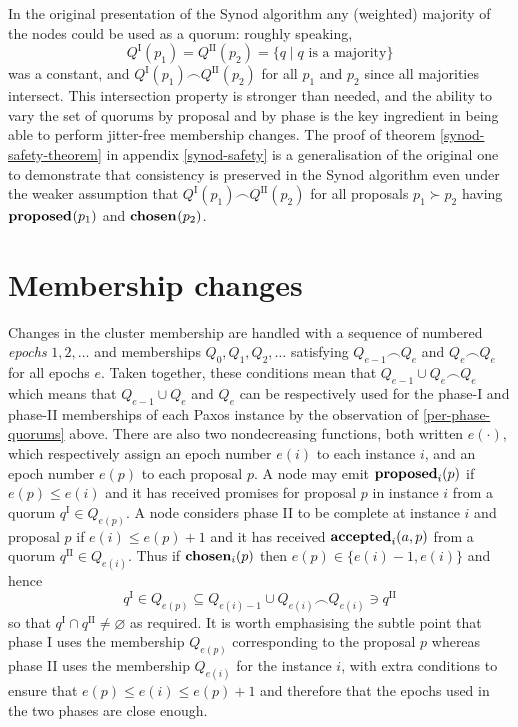 \documentclass[journal]{IEEEtran}
\begin{document}
In the original presentation of the Synod algorithm any (weighted) majority of
the nodes could be used as a quorum: roughly speaking, \[Q^\textrm{I}(p_1) =
Q^\textrm{II}(p_2) = \{ q \mid q \text{ is a majority}\}\] was a constant, and
$Q^\textrm{I}(p_1) \frown Q^\textrm{II}(p_2)$ for all $p_1$ and $p_2$ since all
majorities intersect. This intersection property is stronger than needed, and
the ability to vary the set of quorums by proposal and by phase is the key
ingredient in being able to perform jitter-free membership changes. The proof
of theorem \ref{synod-safety-theorem} in appendix \ref{synod-safety} is a
generalisation of the original one to demonstrate that consistency is preserved
in the Synod algorithm even under the weaker assumption that $Q^\textrm{I}(p_1)
\frown Q^\textrm{II}(p_2)$ for all proposals $p_1 \succ p_2$ having
$\mathbf{proposed}_{}(p_1)$ and $\mathbf{chosen}_{}(p_2)$.

\section{Membership changes}\label{membership-changes}

Changes in the cluster membership are handled with a sequence of numbered
\textit{epochs} $1, 2, \ldots$ and memberships $Q_0, Q_1, Q_2, \ldots$
satisfying $Q_{e-1} \frown Q_e$ and $Q_e \frown Q_e$ for all epochs $e$.  Taken
together, these conditions mean that $Q_{e-1} \cup Q_e \frown Q_e$ which means
that $Q_{e-1} \cup Q_e$ and $Q_e$ can be respectively used for the phase-I and
phase-II memberships of each Paxos instance by the observation of
\ref{per-phase-quorums} above.  There are also two nondecreasing functions,
both written $e(\cdot)$, which respectively assign an epoch number $e(i)$ to
each instance $i$, and an epoch number $e(p)$ to each proposal $p$. A node may
emit $\mathbf{proposed}_{i}(p)$ if $e(p) \le e(i)$ and it has received promises for proposal
$p$ in instance $i$ from a quorum $q^\textrm{I} \in Q_{e(p)}$. A node considers
phase II to be complete at instance $i$ and proposal $p$ if ${e(i) \le e(p)+1}$
and it has received $\mathbf{accepted}_{i}(a,p)$ from a quorum ${q^\textrm{II} \in
Q_{e(i)}}$.  Thus if $\mathbf{chosen}_{i}(p)$ then ${e(p) \in \{ e(i)-1, e(i) \}}$ and
hence \[q^\textrm{I} \in Q_{e(p)} \subseteq Q_{e(i)-1} \cup Q_{e(i)} \frown
Q_{e(i)} \ni q^\textrm{II}\] so that $q^\textrm{I} \cap q^\textrm{II} \ne
\varnothing$ as required. It is worth emphasising the subtle point that phase I
uses the membership $Q_{e(p)}$ corresponding to the proposal $p$ whereas phase
II uses the membership $Q_{e(i)}$ for the instance $i$, with extra conditions
to ensure that $e(p) \le e(i) \le e(p) + 1$ and therefore that the epochs
used in the two phases are close enough.
\end{document}
